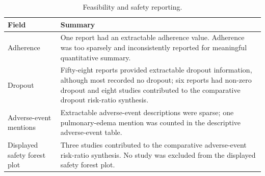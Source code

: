 \begin{table}[H]
\centering
\caption{Feasibility and safety reporting.}
\label{tab:safety}
\small
\begin{tabularx}{\textwidth}{@{}lX@{}}
\toprule
Field & Summary \\
\midrule
Adherence & One report had an extractable adherence value. Adherence was too sparsely and inconsistently reported for meaningful quantitative summary. \\
Dropout & Fifty-eight reports provided extractable dropout information, although most recorded no dropout; six reports had non-zero dropout and eight studies contributed to the comparative dropout risk-ratio synthesis. \\
Adverse-event mentions & Extractable adverse-event descriptions were sparse; one pulmonary-edema mention was counted in the descriptive adverse-event table. \\
Displayed safety forest plot & Three studies contributed to the comparative adverse-event risk-ratio synthesis. No study was excluded from the displayed safety forest plot. \\
\bottomrule
\end{tabularx}
\end{table}
